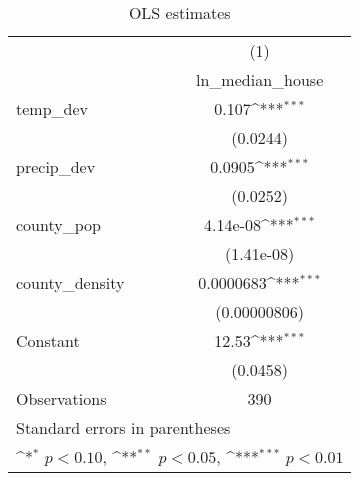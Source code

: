 \begin{table}[htbp]\centering
\def\sym#1{\ifmmode^{#1}\else\(^{#1}\)\fi}
\caption{OLS estimates}
\begin{tabular}{l*{1}{c}}
\hline\hline
                    &\multicolumn{1}{c}{(1)}\\
                    &\multicolumn{1}{c}{ln\_median\_house}\\
\hline
temp\_dev            &       0.107\sym{***}\\
                    &    (0.0244)         \\
[1em]
precip\_dev          &      0.0905\sym{***}\\
                    &    (0.0252)         \\
[1em]
county\_pop          &    4.14e-08\sym{***}\\
                    &  (1.41e-08)         \\
[1em]
county\_density      &   0.0000683\sym{***}\\
                    &(0.00000806)         \\
[1em]
Constant            &       12.53\sym{***}\\
                    &    (0.0458)         \\
\hline
Observations        &         390         \\
\hline\hline
\multicolumn{2}{l}{\footnotesize Standard errors in parentheses}\\
\multicolumn{2}{l}{\footnotesize \sym{*} \(p<0.10\), \sym{**} \(p<0.05\), \sym{***} \(p<0.01\)}\\
\end{tabular}
\end{table}

